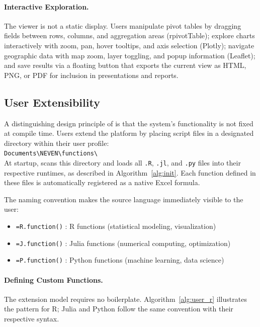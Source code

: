 \paragraph{Interactive Exploration.}
The viewer is not a static display. Users manipulate pivot tables by dragging fields between rows, columns, and aggregation areas (rpivotTable); explore charts interactively with zoom, pan, hover tooltips, and axis selection (Plotly); navigate geographic data with map zoom, layer toggling, and popup information (Leaflet); and save results via a floating button that exports the current view as HTML, PNG, or PDF for inclusion in presentations and reports.

\subsection{User Extensibility}
\label{subsec:extensibility}

A distinguishing design principle of \neven{} is that the system's functionality is not fixed at compile time. Users extend the platform by placing script files in a designated directory within their user profile:\\ 

{\texttt{Documents\textbackslash NEVEN\textbackslash functions\textbackslash}}\\

At startup, \neven{} scans this directory and loads all \texttt{.R}, \texttt{.jl}, and \texttt{.py} files into their respective runtimes, as described in Algorithm~\ref{alg:init}. Each function defined in these files is automatically registered as a native Excel formula.

The naming convention makes the source language immediately visible to the user:
\begin{itemize}
    \item \texttt{=R.function()} : R functions (statistical modeling, visualization)
    \item \texttt{=J.function()} : Julia functions (numerical computing, optimization)
    \item \texttt{=P.function()} : Python functions (machine learning, data science)
\end{itemize}

\paragraph{Defining Custom Functions.}
The extension model requires no boilerplate. Algorithm~\ref{alg:user_r} illustrates the pattern for R; Julia and Python follow the same convention with their respective syntax.

